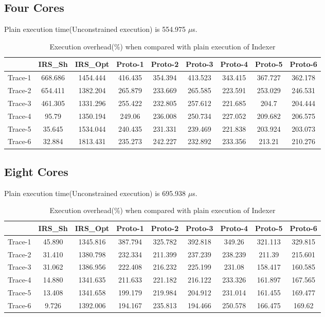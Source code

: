 \subsection{Four Cores}
Plain execution time(Unconstrained execution) is 554.975 $\mu$s.
\begin{table}[h]
\begin{center}
 \begin{tabular}{|c c c c c c c c c|} 
 \hline
 & IRS\_Sh & IRS\_Opt& Proto-1 & Proto-2 & Proto-3 & Proto-4 & Proto-5 & Proto-6\\ %
 \hline
Trace-1 & 668.686 & 1454.444 & 416.435 & 354.394 & 413.523 & 343.415 & 367.727 & 362.178\\
Trace-2 & 654.411 & 1382.204 & 265.879 & 233.669 & 265.585 & 223.591 & 253.029 & 246.531\\
Trace-3 & 461.305 & 1331.296 & 255.422 & 232.805 & 257.612 & 221.685 & 204.7 & 204.444\\
Trace-4 & 95.79 & 1350.194 & 249.06 & 236.008 & 250.734 & 227.052 & 209.682 & 206.575\\
Trace-5 & 35.645 & 1534.044 & 240.435 & 231.331 & 239.469 & 221.838 & 203.924 & 203.073\\
Trace-6 & 32.884 & 1813.431 & 235.273 & 242.227 & 232.892 & 233.356 & 213.21 & 210.276\\
\hline
\end{tabular}
\end{center}
\caption{Execution overhead(\%) when compared with plain execution of Indexer}
\label{indexer_irs_res_cores_4}
\end{table}

\subsection{Eight Cores}
Plain execution time(Unconstrained execution) is 695.938 $\mu$s.
\begin{table}[h]
\begin{center}
 \begin{tabular}{|c c c c c c c c c|} 
 \hline
 & IRS\_Sh & IRS\_Opt& Proto-1 & Proto-2 & Proto-3 & Proto-4 & Proto-5 & Proto-6\\ %
 \hline
Trace-1 & 45.890 & 1345.816 & 387.794 & 325.782 & 392.818 & 349.26 & 321.113 & 329.815\\
Trace-2 & 31.410 & 1380.798 & 232.334 & 211.399 & 237.239 & 238.239 & 211.39 & 215.601\\
Trace-3 & 31.062 & 1386.956 & 222.408 & 216.232 & 225.199 & 231.08 & 158.417 & 160.585\\
Trace-4 & 14.880 & 1341.635 & 211.633 & 221.182 & 216.122 & 233.326 & 161.897 & 167.565\\
Trace-5 & 13.408 & 1341.658 & 199.179 & 219.984 & 204.912 & 231.014 & 161.455 & 169.477\\
Trace-6 & 9.726 & 1392.006 & 194.167 & 235.813 & 194.466 & 250.578 & 166.475 & 169.62\\
\hline
\end{tabular}
\end{center}
\caption{Execution overhead(\%) when compared with plain execution of Indexer}
\label{indexer_irs_res_cores_8}
\end{table}
\newpage
